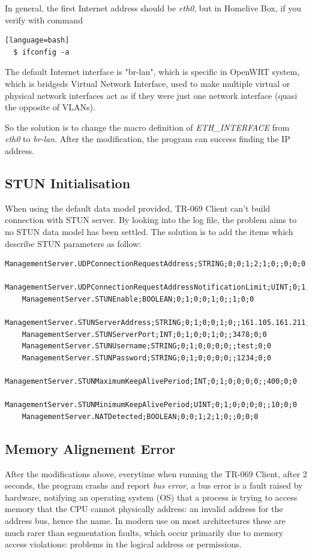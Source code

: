 In general, the first Internet address should be \textit{eth0}, but in Homelive Box, if you verify with command
\begin{lstlisting}[style=DOS][language=bash]
  $ ifconfig -a
\end{lstlisting}

The default Internet interface is "br-lan", which is specific in OpenWRT system, which is bridgeds Virtual Network Interface, used to make multiple virtual or physical network interfaces act as if they were just one network interface (quasi the opposite of VLANs).

So the solution is to change the macro definition of \textit{ETH\_INTERFACE} from \textit{eth0} to \textit{br-lan}. After the modification, the program can success finding the IP address.
\subsection{STUN Initialisation}

When using the default data model provided, TR-069 Client can't build connection with STUN server. By looking into the log file, the problem aims to no STUN data model has been settled. The solution is to add the items which describe STUN parameters as follow:
\begin{lstlisting}[mathescape]
    ManagementServer.UDPConnectionRequestAddress;STRING;0;0;1;2;1;0;;0;0;0
    ManagementServer.UDPConnectionRequestAddressNotificationLimit;UINT;0;1;0;0;0;0;;0;0;0
    ManagementServer.STUNEnable;BOOLEAN;0;1;0;0;1;0;;1;0;0
    ManagementServer.STUNServerAddress;STRING;0;1;0;0;1;0;;161.105.161.211;0;0
    ManagementServer.STUNServerPort;INT;0;1;0;0;1;0;;3478;0;0
    ManagementServer.STUNUsername;STRING;0;1;0;0;0;0;;test;0;0
    ManagementServer.STUNPassword;STRING;0;1;0;0;0;0;;1234;0;0
    ManagementServer.STUNMaximumKeepAlivePeriod;INT;0;1;0;0;0;0;;400;0;0
    ManagementServer.STUNMinimumKeepAlivePeriod;UINT;0;1;0;0;0;0;;10;0;0
    ManagementServer.NATDetected;BOOLEAN;0;0;1;2;1;0;;0;0;0
\end{lstlisting}
\subsection{Memory Alignement Error}
After the modifications above, everytime when running the TR-069 Client, after 2 seconds, the program crashs and report \textit{bus error}, a bus error is a fault raised by hardware, notifying an operating system (OS) that a process is trying to access memory that the CPU cannot physically address: an invalid address for the address bus, hence the name. In modern use on most architectures these are much rarer than segmentation faults, which occur primarily due to memory access violations: problems in the logical address or permissions.

